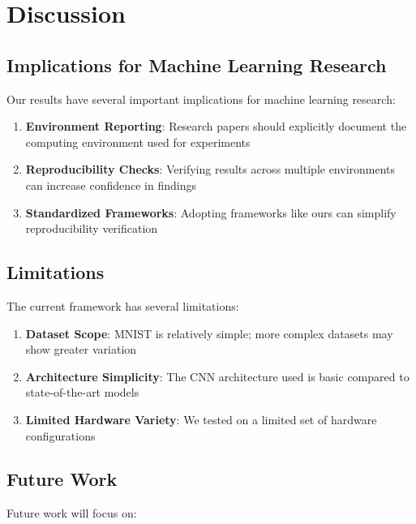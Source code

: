 \documentclass[
]{article}
\providecommand{\tightlist}{%
  \setlength{\itemsep}{0pt}\setlength{\parskip}{0pt}}\usepackage{longtable,booktabs,array}
\begin{document}
\section{Discussion}\label{sec-discussion}

\subsection{Implications for Machine Learning
Research}\label{implications-for-machine-learning-research}

Our results have several important implications for machine learning
research:

\begin{enumerate}
\def\labelenumi{\arabic{enumi}.}
\tightlist
\item
  \textbf{Environment Reporting}: Research papers should explicitly
  document the computing environment used for experiments
\item
  \textbf{Reproducibility Checks}: Verifying results across multiple
  environments can increase confidence in findings
\item
  \textbf{Standardized Frameworks}: Adopting frameworks like ours can
  simplify reproducibility verification
\end{enumerate}

\subsection{Limitations}\label{limitations}

The current framework has several limitations:

\begin{enumerate}
\def\labelenumi{\arabic{enumi}.}
\tightlist
\item
  \textbf{Dataset Scope}: MNIST is relatively simple; more complex
  datasets may show greater variation
\item
  \textbf{Architecture Simplicity}: The CNN architecture used is basic
  compared to state-of-the-art models
\item
  \textbf{Limited Hardware Variety}: We tested on a limited set of
  hardware configurations
\end{enumerate}

\subsection{Future Work}\label{future-work}

Future work will focus on:
\end{document}

